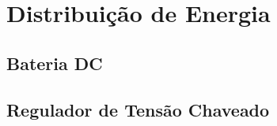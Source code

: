 \documentclass[../delivery_hospital_report.tex]{subfiles}
\begin{document}
\chapter{Distribuição de Energia}
\section{Bateria DC}
\section{Regulador de Tensão Chaveado}
\end{document}
